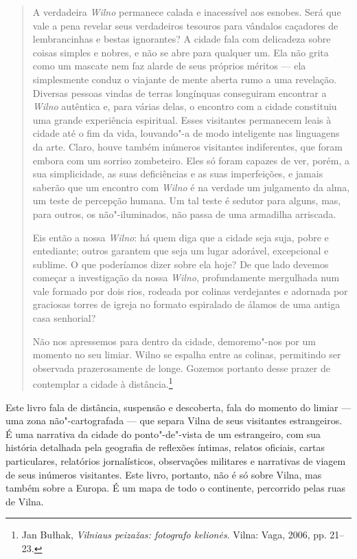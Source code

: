

\begin{quote}
A verdadeira \textit{Wilno} permanece calada e inacessível aos esnobes. Será que
vale a pena revelar seus verdadeiros tesouros para vândalos caçadores de
lembrancinhas e bestas ignorantes? A cidade fala com delicadeza sobre
coisas simples e nobres, e não se abre para qualquer um. Ela não grita
como um mascate nem faz alarde de seus próprios méritos --- ela
simplesmente conduz o viajante de mente aberta rumo a uma revelação.
Diversas pessoas vindas de terras longínquas conseguiram encontrar a
\textit{Wilno} autêntica e, para várias delas, o encontro com a cidade constituiu
uma grande experiência espiritual. Esses visitantes permanecem leais à
cidade até o fim da vida, louvando"-a de modo inteligente nas linguagens
da arte. Claro, houve também inúmeros visitantes indiferentes, que foram
embora com um sorriso zombeteiro. Eles só foram capazes de ver, porém, a
sua simplicidade, as suas deficiências e as suas imperfeições, e jamais
saberão que um encontro com \textit{Wilno} é na verdade um julgamento da alma, um
teste de percepção humana. Um tal teste é sedutor para alguns, mas, para
outros, os não"-iluminados, não passa de uma armadilha arriscada.

Eis então a nossa \textit{Wilno}: há quem diga que a cidade seja suja, pobre e
entediante; outros garantem que seja um lugar adorável, excepcional e
sublime. O que poderíamos dizer sobre ela hoje? De que lado devemos
começar a investigação da nossa \textit{Wilno}, profundamente mergulhada num vale
formado por dois rios, rodeada por colinas verdejantes e adornada por
graciosas torres de igreja no formato espiralado de álamos de uma antiga
casa senhorial?

Não nos apressemos para dentro da cidade, demoremo"-nos por um momento no
seu limiar. Wilno se espalha entre as colinas, permitindo ser observada
prazerosamente de longe. Gozemos portanto desse prazer de contemplar a
cidade à distância.\footnote{Jan Bułhak, \textit{Vilniaus peizažas: fotografo kelionės}. Vilna: Vaga, 2006, pp. 21--23.}
\end{quote}

\asterisc

Este livro fala de distância, suspensão e descoberta, fala do momento do
limiar --- uma zona não"-cartografada --- que separa Vilna de seus visitantes
estrangeiros. É uma narrativa da cidade do ponto"-de"-vista de um
estrangeiro, com sua história detalhada pela geografia de reflexões
íntimas, relatos oficiais, cartas particulares, relatórios
jornalísticos, observações militares e narrativas de viagem de seus
inúmeros visitantes. Este livro, portanto, não é só sobre Vilna, mas
também sobre a Europa. É um mapa de todo o continente, percorrido pelas
ruas de Vilna.


